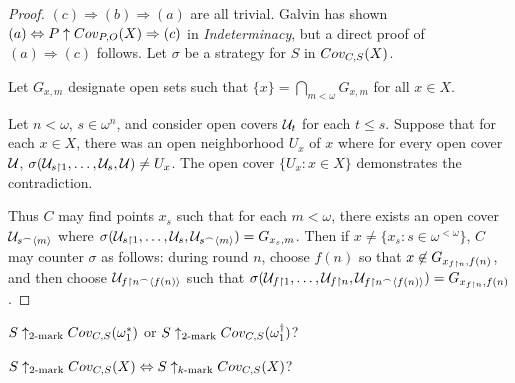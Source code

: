   \begin{proof}
    $(c)\Rightarrow(b)\Rightarrow(a)$ are all trivial. Galvin has shown $(a) \Leftrightarrow P\uparrow Cov_{P,O}(X) \Rightarrow (c)$ in \textit{Indeterminacy}, but a direct proof of $(a)\Rightarrow(c)$ follows. Let $\sigma$ be a strategy for $S$ in $Cov_{C,S}(X)$.

    Let $G_{x,m}$ designate open sets such that $\{x\}=\bigcap_{m<\omega}G_{x,m}$ for all $x\in X$.

    Let $n<\omega$, $s\in\omega^{n}$, and consider open covers $\mathcal{U}_t$ for each $t\leq s$. Suppose that for each $x\in X$, there was an open neighborhood $U_x$ of $x$ where for every open cover $\mathcal{U}$, $\sigma(\mathcal{U}_{s\restriction 1},\dots,\mathcal{U}_{s},\mathcal{U})\not=U_x$. The open cover $\{U_x : x\in X\}$ demonstrates the contradiction.

    Thus $C$ may find points $x_s$ such that for each $m<\omega$, there exists an open cover $\mathcal{U}_{s^\frown\langle m\rangle}$ where $\sigma(\mathcal{U}_{s\restriction 1},\dots,\mathcal{U}_{s},\mathcal{U}_{s^\frown\langle m\rangle})=G_{x_s,m}$. Then if $x\not=\{x_s : s\in\omega^{<\omega}\}$, $C$ may counter $\sigma$ as follows: during round $n$, choose $f(n)$ so that $x\not\in G_{x_{f\restriction n},f(n)}$, and then choose $\mathcal{U}_{f\restriction n^\frown\langle f(n)\rangle}$ such that $\sigma(\mathcal{U}_{f\restriction 1},\dots,\mathcal{U}_{f\restriction n},\mathcal{U}_{f\restriction n^\frown\langle f(n)\rangle})=G_{x_{f\restriction n},f(n)}$.
  \end{proof} 

  \begin{question}
    $S\uparrow_{2\text{-mark}}Cov_{C,S}(\omega_1^*)$ or $S\uparrow_{2\text{-mark}}Cov_{C,S}(\omega_1^\dagger)$?
  \end{question}

  \begin{question}
    $S\uparrow_{2\text{-mark}}Cov_{C,S}(X)\Leftrightarrow S\uparrow_{k\text{-mark}}Cov_{C,S}(X)$?
  \end{question}

